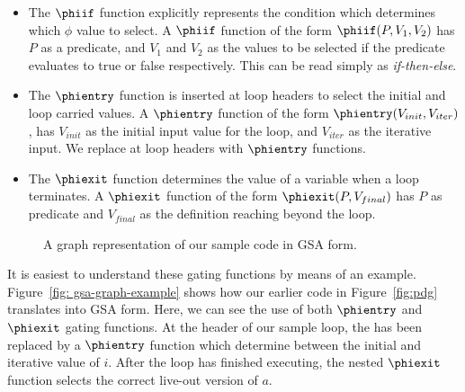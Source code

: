 \begin{itemize}
\item The $\phiif$ function explicitly represents the condition which determines which $\phi$ value to select. 
  A $\phiif$ function of the form $\phiif(P,V_{1},V_{2})$ has $P$ as a predicate, and $V_{1}$ and $V_{2}$ as the values to be selected if the predicate evaluates to true or false respectively. 
  This can be read simply as \textit{if-then-else}.
\item The $\phientry$ function is inserted at loop headers to select the initial and loop carried values. A $\phientry$ function of the form $\phientry(V_{init},V_{iter})$, has $V_{init}$ as the initial input value for the loop, and $V_{iter}$ as the iterative input. We replace \phifuns at loop headers with $\phientry$ functions.
\item The $\phiexit$ function determines the value of a variable when a loop terminates. 
  A $\phiexit$ function of the form $\phiexit(P,V_{final})$ has $P$ as predicate and $V_{final}$ as the definition reaching beyond the loop.
\end{itemize}

\begin{figure}
\centering
{}
\caption{A graph representation of our sample code in GSA form.}
\label{fig: gsa-graph-example}
\end{figure}

It is easiest to understand these gating functions by means of an example. 
Figure~\ref{fig: 
  gsa-graph-example} shows how our earlier code in Figure~\ref{fig:pdg} translates into GSA form. 
Here, we can see the use of both $\phientry$ and $\phiexit$ gating functions. 
At the header of our sample loop, the \phifun has been replaced by a $\phientry$ function which determine between the initial and iterative value of $i$. 
After the loop has finished executing, the nested $\phiexit$ function selects the correct live-out version of $a$.

